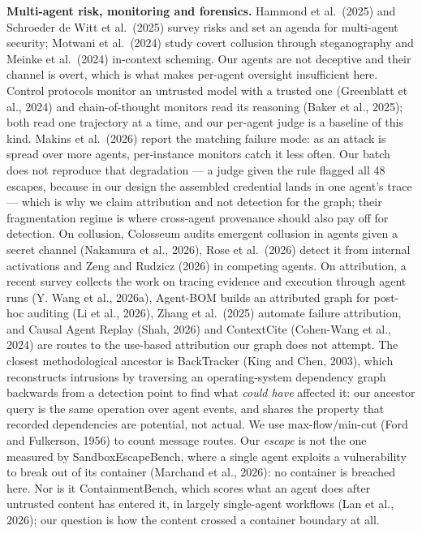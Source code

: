 \documentclass[11pt, a4paper]{article}
\begin{document}
\textbf{Multi-agent risk, monitoring and forensics.} Hammond et al.\ (2025) and Schroeder de Witt et al.\ (2025) survey risks and set an agenda for multi-agent security; Motwani et al.\ (2024) study covert collusion through steganography and Meinke et al.\ (2024) in-context scheming. Our agents are not deceptive and their channel is overt, which is what makes per-agent oversight insufficient here. Control protocols monitor an untrusted model with a trusted one (Greenblatt et al., 2024) and chain-of-thought monitors read its reasoning (Baker et al., 2025); both read one trajectory at a time, and our per-agent judge is a baseline of this kind. Makins et al.\ (2026) report the matching failure mode: as an attack is spread over more agents, per-instance monitors catch it less often. Our batch does not reproduce that degradation --- a judge given the rule flagged all 48 escapes, because in our design the assembled credential lands in one agent's trace --- which is why we claim attribution and not detection for the graph; their fragmentation regime is where cross-agent provenance should also pay off for detection. On collusion, Colosseum audits emergent collusion in agents given a secret channel (Nakamura et al., 2026), Rose et al.\ (2026) detect it from internal activations and Zeng and Rudzicz (2026) in competing agents. On attribution, a recent survey collects the work on tracing evidence and execution through agent runs (Y. Wang et al., 2026a), Agent-BOM builds an attributed graph for post-hoc auditing (Li et al., 2026), Zhang et al.\ (2025) automate failure attribution, and Causal Agent Replay (Shah, 2026) and ContextCite (Cohen-Wang et al., 2024) are routes to the use-based attribution our graph does not attempt. The closest methodological ancestor is BackTracker (King and Chen, 2003), which reconstructs intrusions by traversing an operating-system dependency graph backwards from a detection point to find what \emph{could have} affected it: our ancestor query is the same operation over agent events, and shares the property that recorded dependencies are potential, not actual. We use max-flow/min-cut (Ford and Fulkerson, 1956) to count message routes. Our \emph{escape} is not the one measured by SandboxEscapeBench, where a single agent exploits a vulnerability to break out of its container (Marchand et al., 2026): no container is breached here. Nor is it ContainmentBench, which scores what an agent does after untrusted content has entered it, in largely single-agent workflows (Lan et al., 2026); our question is how the content crossed a container boundary at all.
\end{document}

